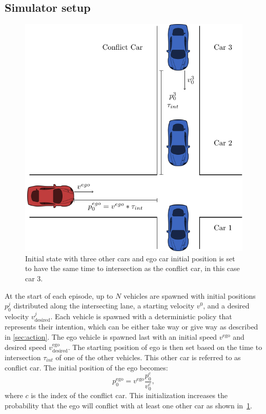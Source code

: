 \subsection{Simulator setup}
\label{sec:simulation_setup}

\begin{figure}[!t]
    \centering
        \includegraphics[width=0.7\columnwidth]{figures/figures-conflict_car.pdf}
        \caption{Initial state with three other cars and ego car initial position is set to have the same time to intersection as the conflict car, in this case car 3.}
    \label{fig:conflict_car}
\end{figure}


At the start of each episode, up to $N$ vehicles are spawned with initial positions $p^j_0$ distributed along the intersecting lane, a starting velocity $v^0$, and a desired velocity $v^j_\mathrm{desired}$. Each vehicle is spawned with a deterministic policy that represents their intention, which can be either take way or give way as described in \ref{sec:action}. The ego vehicle is spawned last with an initial speed $v^\mathrm{ego}$ and desired speed $v^\mathrm{ego}_\mathrm{desired}$. The starting position of ego is then set based on the time to intersection $\tau_{int}$ of one of the other vehicles. This other car is referred to as conflict car. The initial position of the ego becomes: 
\begin{equation}
    p^\mathrm{ego}_{0} = v^\mathrm{ego} \frac{p^{c}_{0}}{v^{c}_{0}},
\end{equation}
where $c$ is the index of the conflict car. This initialization increases the probability that the ego will conflict with at least one other car as shown in~\ref{fig:conflict_car}. 

